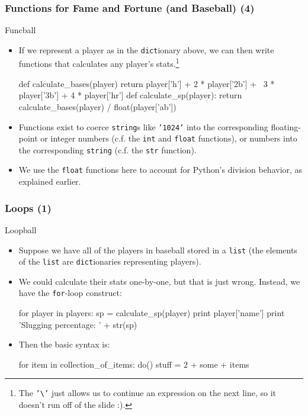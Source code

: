 \documentclass[10pt]{beamer}
\begin{document}
\begin{frame}[fragile]
  \frametitle{Functions for Fame and Fortune (and Baseball) (4)}
  \begin{block}{Funcball}
    \begin{itemize}
      \item If we represent a player as in the \texttt{dict}ionary above, we can then write functions that calculates any player's stats.\footnote{The \texttt{'\textbackslash'} just allows us to continue an expression on the next line, so it doesn't run off of the slide :).}
      \footnotesize
      \begin{pythoncode}
  def calculate_bases(player)
    return player['h'] + 2 * player['2b'] + \
      3 * player['3b'] + 4 * player['hr']
  def calculate_sp(player):
    return calculate_bases(player) / float(player['ab'])
      \end{pythoncode}
      \normalsize
      \item Functions exist to coerce \texttt{string}s like \texttt{'1024'} into the corresponding floating-point or integer numbers (c.f. the \texttt{int} and \texttt{float} functions), or numbers into the corresponding \texttt{string} (c.f. the \texttt{str} function).
      \item We use the \texttt{float} functions here to account for Python's division behavior, as explained earlier.
    \end{itemize}
  \end{block}
\end{frame}

\begin{frame}[fragile]
  \frametitle{Loops (1)}
  \begin{block}{Loopball}
    \begin{itemize}
      \item Suppose we have all of the players in baseball stored in a \texttt{list} (the elements of the \texttt{list} are \texttt{dict}ionaries representing players).
      \item We could calculate their stats one-by-one, but that is just wrong.
        Instead, we have the \texttt{for}-loop construct:
        \begin{pythoncode}
  for player in players:
    sp = calculate_sp(player)
    print player['name']
    print 'Slugging percentage: ' + str(sp)
        \end{pythoncode}
      \item Then the basic syntax is:
      \begin{pythoncode}
  for item in collection_of_items:
    do()
    stuff = 2 + some + items
      \end{pythoncode}
    \end{itemize}
  \end{block}
\end{frame}
\end{document}
